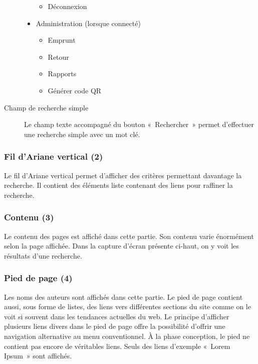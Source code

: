 \documentclass[letter, 11pt]{report}
\begin{document}
\begin{description}
\begin{itemize}
\begin{itemize}
				\item Déconnexion
			\end{itemize}
		\end{itemize}
			\begin{itemize}
			\item Administration (lorsque connecté)
			\begin{itemize}
				\item Emprunt
				\item Retour
				\item Rapports
				\item Générer code QR
			\end{itemize}
		\end{itemize}
	\item[Champ de recherche simple] Le champ texte accompagné du bouton «~Rechercher~» permet d'effectuer une recherche simple avec un mot clé.
\end{description}

\subsubsection{Fil d'Ariane vertical (2)}
Le fil d'Ariane vertical permet d'afficher des critères permettant davantage la recherche. Il contient des éléments liste contenant des liens pour raffiner la recherche.

\subsubsection{Contenu (3)}
Le contenu des pages est affiché dans cette partie. Son contenu varie énormément selon la page affichée. Dans la capture d'écran présente ci-haut, on y voit les résultats d'une recherche.

\subsubsection{Pied de page (4)}
Les noms des auteurs sont affichés dans cette partie. Le pied de page contient aussi, sous forme de listes, des liens vers différentes sections du site comme on le voit si souvent dans les tendances actuelles du web. Le principe d'afficher plusieurs liens divers dans le pied de page offre la possibilité d'offrir une navigation alternative au menu conventionnel. À la phase conception, le pied ne contient pas encore de véritables liens. Seuls des liens d'exemple «~Lorem Ipsum~» sont affichés.
\end{document}
